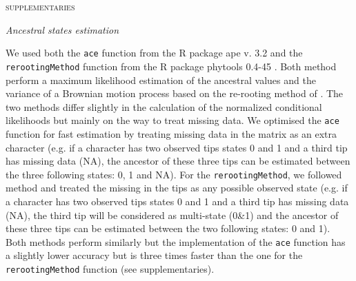 \documentclass[12pt,letterpaper]{article}
\renewcommand{\section}[1]{%
\bigskip
\begin{center}
\begin{Large}
\normalfont\scshape #1
\medskip
\end{Large}
\end{center}}
\renewcommand{\subsection}[1]{%
\bigskip
\begin{center}
\begin{large}
\normalfont\itshape #1
\end{large}
\end{center}}
\begin{document}




\section{supplementaries}

\subsection{Ancestral states estimation}
We used both the \texttt{ace} function from the R package ape v. 3.2 \cite{paradisape:2004} and the 
\texttt{rerootingMethod} function from the R package phytools 0.4-45 \cite{phytools}. Both method perform a maximum likelihood estimation of the ancestral values and the variance of a Brownian motion process based on the re-rooting method of \cite{Yang01121995}. The two methods differ slightly in the calculation of the normalized conditional likelihoods but mainly on the way to treat missing data. We optimised the \texttt{ace} function for fast estimation by treating missing data in the matrix as an extra character (e.g. if a character has two observed tips states 0 and 1 and a third tip has missing data (NA), the ancestor of these three tips can be estimated between the three following states: 0, 1 and NA). For the \texttt{rerootingMethod}, we followed \cite{Claddis} method and treated the missing in the tips as any possible observed state (e.g. if a character has two observed tips states 0 and 1 and a third tip has missing data (NA), the third tip will be considered as multi-state (0\&1) and the ancestor of these three tips can be estimated between the two following states: 0 and 1). Both methods perform similarly but the implementation of the \texttt{ace} function has a slightly lower accuracy  but is three times faster than the one for the \texttt{rerootingMethod} function (see supplementaries).
\end{document}
